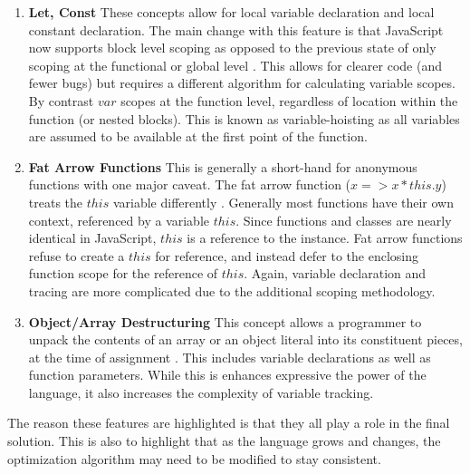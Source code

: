   \begin{enumerate}
    \item \textbf{Let, Const} These concepts allow for local variable declaration and local constant declaration.  The main change with this feature is that JavaScript now supports block level scoping as opposed to the previous state of only scoping at the functional or global level \cite{let16} \cite{const16}.  This allows for clearer code (and fewer bugs) but requires a different algorithm for calculating variable scopes.  By contrast $var$ scopes at the function level, regardless of location within the function (or nested blocks).  This is known as variable-hoisting as all variables are assumed to be available at the first point of the function.
    \item \textbf{Fat Arrow Functions} This is generally a short-hand for anonymous functions with one major caveat.  The fat arrow function ($x => x * this.y$) treats the $this$ variable differently \cite{arrowfn16}.  Generally most functions have their own context, referenced by a variable $this$.  Since functions and classes are nearly identical in JavaScript, $this$ is a reference to the instance.  Fat arrow functions refuse to create a $this$ for reference, and instead defer to the enclosing function scope for the reference of $this$. Again, variable declaration and tracing are more complicated due to the additional scoping methodology.
    \item \textbf{Object/Array Destructuring}  This concept allows a programmer to unpack the contents of an array or an object literal into its constituent pieces, at the time of assignment \cite{destructuring16}.  This includes variable declarations as well as function parameters.  While this is enhances expressive the power of the language, it also increases the complexity of variable tracking.  
  \end{enumerate}

The reason these features are highlighted is that they all play a role in the final solution.  This is also to highlight that as the language grows and changes, the optimization algorithm may need to be modified to stay consistent. 